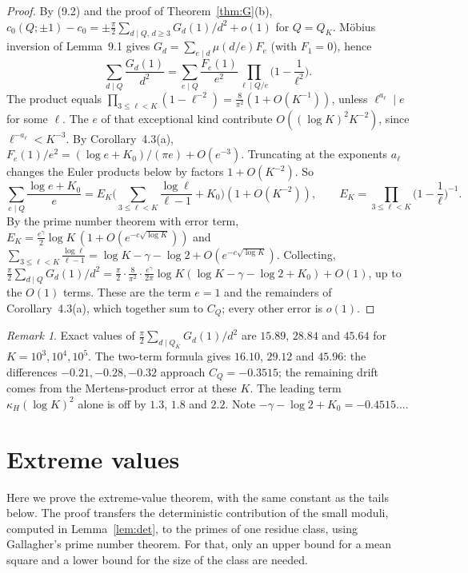 \documentclass[11pt]{amsart}
\theoremstyle{remark}
\newtheorem{remark}[lemma]{Remark}
\begin{document}
\begin{proof}
By (9.2) and the proof of Theorem~\ref{thm:G}(b), $c_0(Q;\pm1)-c_0=\pm\frac\pi2\sum_{d\mid Q,\,d\ge3}G_d(1)/d^2+o(1)$ for $Q=Q_K$. Möbius inversion of Lemma~9.1 gives $G_d=\sum_{e\mid d}\mu(d/e)F_e$ (with $F_1=0$), hence
\[
\sum_{d\mid Q}\frac{G_d(1)}{d^2}=\sum_{e\mid Q}\frac{F_e(1)}{e^2}\prod_{\ell\mid Q/e}\Big(1-\frac1{\ell^2}\Big).
\]
The product equals $\prod_{3\le\ell<K}(1-\ell^{-2})=\frac8{\pi^2}(1+O(K^{-1}))$, unless $\ell^{a_\ell}\mid e$ for some $\ell$. The $e$ of that exceptional kind contribute $O((\log K)^2K^{-2})$, since $\ell^{-a_\ell}<K^{-3}$. By Corollary~4.3(a), $F_e(1)/e^2=(\log e+K_0)/(\pi e)+O(e^{-3})$. Truncating at the exponents $a_\ell$ changes the Euler products below by factors $1+O(K^{-2})$. So
\[
\sum_{e\mid Q}\frac{\log e+K_0}e=E_K\Big(\sum_{3\le\ell<K}\frac{\log\ell}{\ell-1}+K_0\Big)(1+O(K^{-2})),\qquad E_K=\prod_{3\le\ell<K}\Big(1-\frac1\ell\Big)^{-1}.
\]
By the prime number theorem with error term, $E_K=\frac{e^\gamma}2\log K\,(1+O(e^{-c\sqrt{\log K}}))$ and $\sum_{3\le\ell<K}\frac{\log\ell}{\ell-1}=\log K-\gamma-\log2+O(e^{-c\sqrt{\log K}})$. Collecting, $\frac\pi2\sum_{d\mid Q}G_d(1)/d^2=\frac\pi2\cdot\frac8{\pi^2}\cdot\frac{e^\gamma}{2\pi}\log K(\log K-\gamma-\log2+K_0)+O(1)$, up to the $O(1)$ terms. These are the term $e=1$ and the remainders of Corollary~4.3(a), which together sum to $C_Q$; every other error is $o(1)$.
\end{proof}

\begin{remark}
Exact values of $\frac\pi2\sum_{d\mid Q_K}G_d(1)/d^2$ are $15.89$, $28.84$ and $45.64$ for $K=10^3,10^4,10^5$. The two-term formula gives $16.10$, $29.12$ and $45.96$: the differences $-0.21,-0.28,-0.32$ approach $C_Q=-0.3515$; the remaining drift comes from the Mertens-product error at these $K$. The leading term $\kappa_H(\log K)^2$ alone is off by $1.3$, $1.8$ and $2.2$. Note $-\gamma-\log2+K_0=-0.4515\ldots$.
\end{remark}

\section{Extreme values}\label{sec:H}

Here we prove the extreme-value theorem, with the same constant as the tails below. The proof transfers the deterministic contribution of the small moduli, computed in Lemma~\ref{lem:det}, to the primes of one residue class, using Gallagher's prime number theorem. For that, only an upper bound for a mean square and a lower bound for the size of the class are needed.
\end{document}
